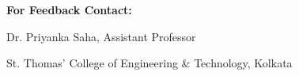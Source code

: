 \begin{center}
\begin{minipage}[t][0.80\textheight][t]{0.76\textwidth}
  \medskip
  \textbf{For Feedback Contact:}\par
  Dr. Priyanka Saha, Assistant Professor\par
  St. Thomas' College of Engineering \& Technology, Kolkata\par
  \par
\end{minipage}
\end{center}